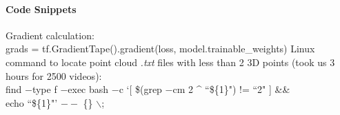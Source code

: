 \paragraph{Code Snippets}\label{sec:code-snippets}

\begin{outline}
    \1 Gradient calculation:\\grads = tf.GradientTape().gradient(loss, model.trainable\_weights)
    \1 Linux command to locate point cloud \textit{.txt} files with less than 2 3D points (took us 3 hours for 2500 videos):\\find $-$type f $-$exec bash $-$c `[ \$(grep $-$cm 2 \^{} ``\$\{1\}") != ``2" ] \&\&\\echo ``\$\{1\}"' $--$ \{\} $\backslash$;
\end{outline}
